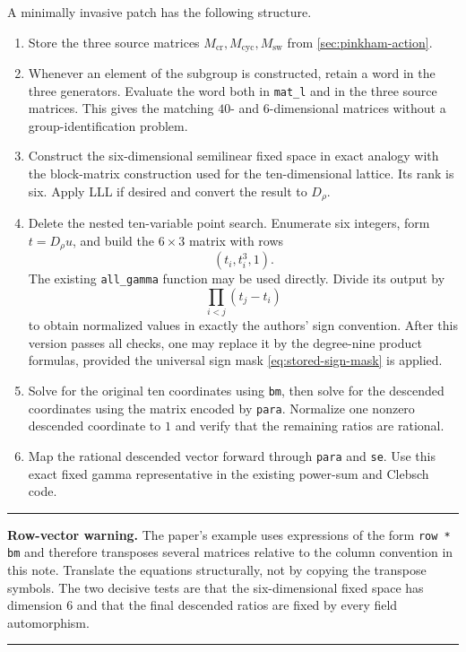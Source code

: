 \documentclass[11pt]{article}
\newenvironment{summarybox}{%
  \begin{center}\begin{minipage}{0.94\textwidth}\small
  \hrule\vspace{0.55em}}{%
  \vspace{0.55em}\hrule\end{minipage}\end{center}}
\begin{document}
A minimally invasive patch has the following structure.

\begin{enumerate}
\item Store the three source matrices
$M_{\mathrm{cr}},M_{\mathrm{cyc}},M_{\mathrm{sw}}$ from
\cref{sec:pinkham-action}.

\item Whenever an element of the subgroup is constructed, retain a word in the
three generators.  Evaluate the word both in \texttt{mat\_l} and in the three source
matrices.  This gives the matching $40$- and $6$-dimensional matrices without a
group-identification problem.

\item Construct the six-dimensional semilinear fixed space in exact analogy with
the block-matrix construction used for the ten-dimensional lattice.  Its rank is six.
Apply LLL if desired and convert the result to $D_\rho$.

\item Delete the nested ten-variable point search.  Enumerate six integers, form
$t=D_\rho u$, and build the $6\times3$ matrix with rows
\[
  (t_i,t_i^3,1).
\]
The existing \texttt{all\_gamma} function may be used directly.  Divide its output
by
\[
  \prod_{i<j}(t_j-t_i)
\]
to obtain normalized values in exactly the authors' sign convention.  After this
version passes all checks, one may replace it by the degree-nine product formulas,
provided the universal sign mask \eqref{eq:stored-sign-mask} is applied.

\item Solve for the original ten coordinates using \texttt{bm}, then solve for the
descended coordinates using the matrix encoded by \texttt{para}.  Normalize one
nonzero descended coordinate to $1$ and verify that the remaining ratios are
rational.

\item Map the rational descended vector forward through \texttt{para} and
\texttt{se}.  Use this exact fixed gamma representative in the existing power-sum
and Clebsch code.
\end{enumerate}

\begin{summarybox}
\textbf{Row-vector warning.}
The paper's example uses expressions of the form
\texttt{row * bm} and therefore transposes several matrices relative to the column
convention in this note.  Translate the equations structurally, not by copying the
transpose symbols.  The two decisive tests are that the six-dimensional fixed space
has dimension $6$ and that the final descended ratios are fixed by every field
automorphism.
\end{summarybox}
\end{document}
